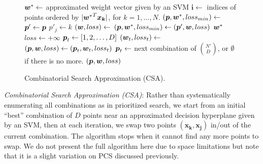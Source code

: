 \begin{figure}[tp!]
\vspace{-3mm}
\caption{
Combinatorial Search Approximation (CSA).\hfill \; \\
}
\label{alg:cs.approximation}
{\footnotesize 
\begin{algorithmic}[1]
 
\State $\boldsymbol{w}^* \gets$ approximated weight vector given by an SVM
\State $\boldsymbol{i} \gets$ indices of points ordered by $|{\boldsymbol{w}^*}^T\boldsymbol{x_k}|$, for $k=1, \dots, N$.
\State $(\boldsymbol{p}, \boldsymbol{w}^*, loss_{min}) \gets$ 
\Loop
            \State $\boldsymbol{p}' \gets \boldsymbol{p}$
            \State $p'_j \gets k$
            \State $(\boldsymbol{w}, loss) \gets$ 
               \State $(\boldsymbol{p}, \boldsymbol{w}^*, loss_{min}) \gets (\boldsymbol{p}', \boldsymbol{w}, loss)$
            \EndIf
         \EndFor
      \EndIf
   \EndFor
   \State \Return $\boldsymbol{w}^*$
 \EndLoop
\Statex
{} 
   \State $loss \gets +\infty$
   \State $\boldsymbol{p}_t \gets [1,2,\dots,D]$
      \State $(\boldsymbol{w}_t, loss_t) \gets$ 
         \State $(\boldsymbol{p}, \boldsymbol{w}, loss) \gets (\boldsymbol{p}_t, \boldsymbol{w}_t, loss_t)$
      \EndIf
      \State $\boldsymbol{p}_t \gets $ next combination of ${N' \choose D}$, or $\emptyset$ if there is no more.
   \EndWhile
   \State \Return $(\boldsymbol{p}, \boldsymbol{w}, loss)$
\EndFunction
\Statex
\EndFunction
\end{algorithmic}}
\vspace{-4mm}
\end{figure}

\ENDCOMMENT

\noindent \emph{Combinatorial Search Approximation (CSA)}: Rather than
systematically enumerating all combinations as in prioritized search,
we start from an initial ``best'' combination of $D$ points near an
approximated decision hyperplane given by an SVM, then at each
iteration, we swap two points $(\boldsymbol{x_k, x_j})$ in/out of the
current combination. The algorithm stops when it cannot find any more
points to swap.  We do not present the full algorithm here due to
space limitations but note that it is a slight variation on PCS 
discussed previously.
